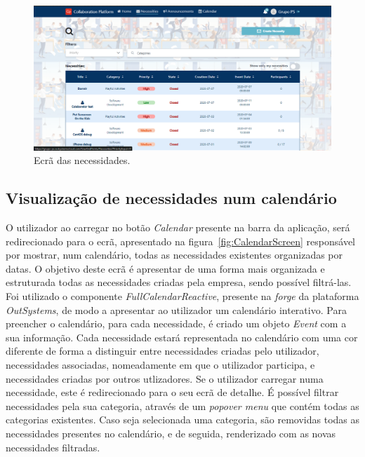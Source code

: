 \begin{figure}[H]
  \centering 
  \includegraphics[scale=0.3]{figures/NecessitiesGeneralScreen.png}
  \caption{Ecrã das necessidades.}\label{fig:NecessitiesScreen}
\end{figure}



\subsection{Visualização de necessidades num calendário}\label{subsec:implementacao:calendarNecessitiesView}

O utilizador ao carregar no botão \textit{Calendar} presente na barra da aplicação, será redirecionado para o ecrã, apresentado na figura~\ref{fig:CalendarScreen} responsável por mostrar, num calendário, todas as necessidades existentes organizadas por datas. 
O objetivo deste ecrã é apresentar de uma forma mais organizada e estruturada todas as necessidades criadas pela empresa, sendo possível filtrá-las. 
Foi utilizado o componente \textit{FullCalendarReactive}, presente na \textit{forge} da plataforma \textit{OutSystems}, de modo a apresentar ao utilizador um calendário interativo.
Para preencher o calendário, para cada necessidade, é criado um objeto \textit{Event} com a sua informação. 
Cada necessidade estará representada no calendário com uma cor diferente de forma a distinguir entre necessidades criadas pelo utilizador, necessidades associadas, nomeadamente em que o utilizador participa, e necessidades criadas por outros utlizadores.
Se o utilizador carregar numa necessidade, este é redirecionado para o seu ecrã de detalhe. 
É possível filtrar necessidades pela sua categoria, através de um \textit{popover menu} que contém todas as categorias existentes. 
Caso seja selecionada uma categoria, são removidas todas as necessidades presentes no calendário, e de seguida, renderizado com as novas necessidades filtradas.

